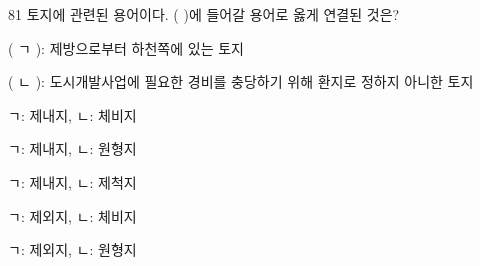 \begin{question}{81}
토지에 관련된 용어이다. ( )에 들어갈 용어로 옳게 연결된 것은?
\begin{framedtext}
( ㄱ ): 제방으로부터 하천쪽에 있는 토지 \par
( ㄴ ): 도시개발사업에 필요한 경비를 충당하기 위해 환지로 정하지 아니한 토지 \par
\end{framedtext}
\begin{choices}
  \item ㄱ: 제내지, ㄴ: 체비지
  \item ㄱ: 제내지, ㄴ: 원형지
  \item ㄱ: 제내지, ㄴ: 제척지
  \item ㄱ: 제외지, ㄴ: 체비지
  \item ㄱ: 제외지, ㄴ: 원형지
\end{choices}
\end{question}
